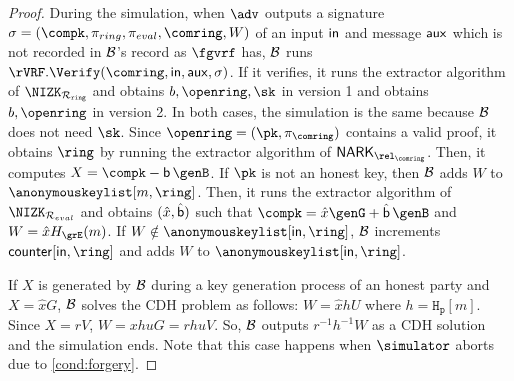 \begin{proof}
	
	
	During the simulation, when $ \adv $ outputs a signature $ \sigma = (\compk,\pi_{ring}, \allowbreak \pi_{eval}, \allowbreak \comring,W) $ of an input  $ \mathsf{in} $ and message $ \mathsf{aux} $ which is not recorded in $ \mathcal{B} $'s record as $ \fgvrf $ has, $ \mathcal{B} $ runs $ \rVRF.\Verify(\comring,\msg, \aux, \sigma) $. If it verifies, it runs the extractor algorithm of $ \NIZK_{\Rring} $ and obtains $ b, \openring, \sk $ in version 1 and obtains $ b, \openring $ in version 2. In both cases, the simulation is the same because $ \mathcal{B} $ does not need $ \sk $.  Since $\openring = (\pk, \picomring)$ contains a valid proof,  it obtains $ \ring $ by running the extractor algorithm of $ \NARK_{\relcomring} $.  	
	 Then, it computes $ X = \compk - \openpk \, \genB $.
	If $ \pk $ is not an honest key, then $\mathcal{B} $ adds $ W $  to $ \anonymouskeylist[m, \ring] $.  
	Then, it  runs the extractor algorithm of $ \NIZK_{\rcom} $ and obtains $(\hat{x},\hat{\mathsf{b}} )$ such that $ \compk = \hat{x}\genG + \hat{\openpk} \, \genB $ and $ W = \hat{x} \hashG(m) $. If  $ W \notin \anonymouskeylist[\msg, \ring] $, $ \mathcal{B} $ increments  $ \counter[\msg,\ring] $ and adds $ W $ to $ \anonymouskeylist[\msg,\ring] $.
	
	If $ X  $ is generated by $ \mathcal{B} $ during a key generation process of an honest party and $ X = \hat{x}G $, $ \mathcal{B} $ solves the CDH problem as follows: $ W = \hat{x} h U $ where $ h = \mathtt{H_p}[m] $. Since $ X = r V $, $ W = xhuG =rhuV $. So, $ \mathcal{B} $ outputs $ r^{-1}h^{-1}W $ as a CDH solution and the simulation ends. Note that this case happens when $ \simulator $ aborts due to \ref{cond:forgery}.
	

\end{proof}
